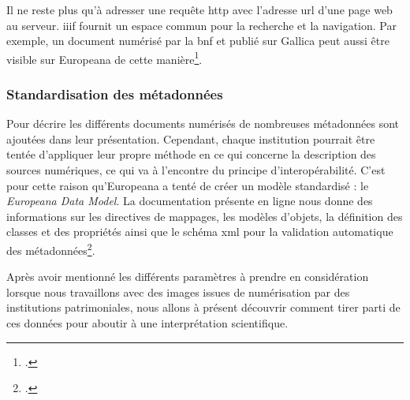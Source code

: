 Il ne reste plus qu'à adresser une requête \gls{http} avec l'adresse \gls{url} d'une page web au serveur. \gls{iiif} fournit un espace commun pour la recherche et la navigation. Par exemple, un document numérisé par la \gls{bnf} et publié sur Gallica peut aussi être visible sur Europeana de cette manière\footcite{charpierAtelierInitiationIIIF2024}.

\subsubsection{Standardisation des métadonnées}

Pour décrire les différents documents numérisés de nombreuses métadonnées sont ajoutées dans leur présentation. Cependant, chaque institution pourrait être tentée d'appliquer leur propre méthode en ce qui concerne la description des sources numériques, ce qui va à l'encontre du principe d'interopérabilité. C'est pour cette raison qu'Europeana a tenté de créer un modèle standardisé : le \textit{Europeana Data Model}. La documentation présente en ligne nous donne des informations sur les directives de mappages, les modèles d'objets, la définition des classes et des propriétés ainsi que le schéma \gls{xml} pour la validation automatique des métadonnées\footcite{EuropeanaDataModel}. 


Après avoir mentionné les différents paramètres à prendre en considération lorsque nous travaillons avec des images issues de numérisation par des institutions patrimoniales, nous allons à présent découvrir comment tirer parti de ces données pour aboutir à une interprétation scientifique.